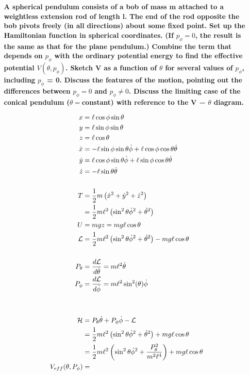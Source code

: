 \documentclass[10pt]{article} %
\begin{document}
\textbf{A spherical pendulum consists of a bob of mass m attached to a weightless extension rod of length l. The end of the rod opposite the bob pivots freely (in all directions) about some fixed point. Set up the Hamiltonian function in spherical coordinates. (If $p_{\phi}=0$, the result is the same as that for the plane pendulum.) Combine the term that depends on $p_{\phi}$ with the ordinary potential energy to find the effective potential $V(\theta,p_{\phi})$. Sketch V as a function of $\theta$ for several values of $p_{\phi}$, including $p_{\phi}$ = 0. Discuss the features of the motion, pointing out the differences between $p_{\phi}=0$ and $p_{\phi} \neq 0$. Discuss the limiting case of the conical pendulum ($\theta = $constant) with reference to the V − $\theta$ diagram.}

\begin{align*}
  x &= \ell\cos\phi\sin\theta\\
  y &= \ell\sin\phi\sin\theta\\
  z &= \ell\cos\theta\\
  \dot{x} &=  -\ell\sin\phi\sin\theta\dot{\phi} + \ell\cos\phi\cos\theta\dot{\theta}\\
  \dot{y} &= \ell\cos\phi\sin\theta\dot{\phi} + \ell\sin\phi\cos\theta\dot{\theta}\\
  \dot{z} &= -\ell\sin\theta\dot{\theta}\\
  \vspace{1cm}\\
  T &= \frac{1}{2}m\left(\dot{x}^2+\dot{y}^2+\dot{z}^2\right)\\
  &= \frac{1}{2}m\ell^2\left(\sin^2\theta\dot{\phi}^2 + \dot{\theta}^2\right)\\
  U &= mgz = mg\ell\cos\theta\\
  \mathcal{L} &= \frac{1}{2}m\ell^2\left(\sin^2\theta\dot{\phi}^2 + \dot{\theta}^2\right) - mg\ell\cos\theta\\
  \vspace{1cm}\\
  P_{\theta} &= \frac{d\mathcal{L}}{d\dot{\theta}} = m\ell^2\dot{\theta}\\
  P_{\phi} &= \frac{d\mathcal{L}}{d\dot{\phi}} = m\ell^2\sin^2(\theta)\dot{\phi}\\
  \vspace{1cm}\\
  \vspace{1cm}\\
  \mathcal{H} &= P_{\theta}\dot{\theta} + P_{\phi}\dot{\phi} - \mathcal{L}\\
  &= \frac{1}{2}m\ell^2\left(\sin^2\theta\dot{\phi}^2 + \dot{\theta}^2\right) + mg\ell\cos\theta\\
  &= \frac{1}{2}m\ell^2\left(\sin^2\theta\dot{\phi}^2 + \frac{P_{\theta}^2}{m^2\ell^4}\right) + mg\ell\cos\theta\\

    V_{eff}(\theta, P_{\phi}) &=
\end{align*}
\end{document}
